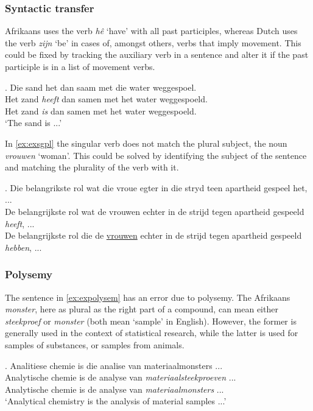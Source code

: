\documentclass[11pt]{article}
\begin{document}
\subsubsection{Syntactic transfer}

Afrikaans uses the verb {\em hê} `have' with all past participles, whereas Dutch uses the 
verb {\em zijn} `be' in cases of, amongst others, verbs that imply movement. This could be fixed 
by tracking the auxiliary verb in a sentence and alter it if the past participle is in a list
of movement verbs.

\ex. \label{ex:exsgpl} 
    Die sand het dan saam met die water weggespoel. \\
    Het zand {\em heeft} dan samen met het water weggespoeld. \\
    Het zand {\em is} dan samen met het water weggespoeld. \\
   `The sand is ...'

In \ref{ex:exsgpl} the singular verb does not match the plural subject, the noun {\em vrouwen} `woman'. This 
could be solved by identifying the subject of the sentence and matching the plurality 
of the verb with it.

\ex. \label{ex:exsgpl} 
    Die belangrikste rol wat die vroue egter in die stryd teen apartheid gespeel het, ... \\
    De belangrijkste rol wat de vrouwen echter in de strijd tegen apartheid gespeeld {\em heeft}, ... \\
    De belangrijkste rol die de \underline{vrouwen} echter in de strijd tegen apartheid gespeeld {\em hebben}, ... \\

\subsubsection{Polysemy}

The sentence in \ref{ex:expolysem} has an error due to polysemy. The Afrikaans {\em monster}, here 
as plural as the right part of a compound, can mean either {\em steekproef} or {\em monster} (both 
mean `sample' in English). However, the former is generally used in the context of statistical 
research, while the latter is used for samples of substances, or samples from animals. 

\ex. \label{ex:expolysem} 
    Analitiese chemie is die analise van materiaalmonsters ... \\
    Analytische chemie is de analyse van {\em materiaalsteekproeven} ... \\
    Analytische chemie is de analyse van {\em materiaalmonsters} ... \\
   `Analytical chemistry is the analysis of material samples ...'
\end{document}
